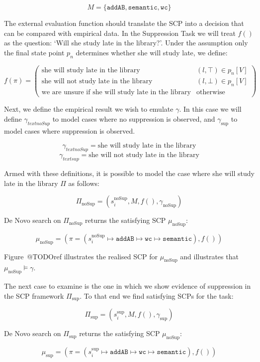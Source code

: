 \[
M=\{\texttt{addAB}, \texttt{semantic}, \texttt{wc}\}
\]

The external evaluation function should translate the SCP into a decision that can be compared with empirical data. In the Suppression Task we will treat $f()$ as the question: `Will she study late in the library?'. Under the assumption only the final state point $p_n$
determines whether she will study late, we define:

\[
f(\pi) = \begin{pmatrix} \text{she will study late in the library} & (l,\top) \in p_n[V] \\   \text{she will not study late in the library} & (l,\bot) \in p_n[V] \\ 
\text{we are unsure if she will study late in the library} & \text{otherwise} \end{pmatrix}
\]

Next, we define the empirical result we wish to emulate $\gamma$. In this case we will define $\gamma_{text{noSup}}$ to model cases where no suppression is observed, and $\gamma_{\text{sup}}$ to model cases where suppression is observed.

\[\gamma_{text{noSup}} = \text{she will study late in the library} \]
\[\gamma_{text{sup}} = \text{she will not study late in the library} \]

Armed with these definitions, it is possible to model the case where she will study late in the library $\Pi$ as follows:

\[\Pi_\text{noSup}=(s_i^{\text{noSup}},M,f(),\gamma_{\text{noSup}})\]

De Novo search on $\Pi_\text{noSup}$ returns the satisfying SCP $\mu_\text{noSup}$:

\[\mu_\text{noSup}=(\pi=(s_i^{\text{noSup}} \longmapsto \texttt{addAB} \longmapsto \texttt{wc} \longmapsto \texttt{semantic}),f())\]

Figure~@TODOref illustrates the realised SCP for $\mu_\text{noSup}$ and illustrates that $\mu_\text{noSup} \models \gamma$.

The next case to examine is the one in which we show evidence of suppression in the SCP framework $\Pi_\text{sup}$. To that end we find satisfying SCPs for the task:

\[\Pi_\text{sup}=(s_i^{\text{sup}},M,f(),\gamma_{\text{sup}})\]

De Novo search on $\Pi_\text{sup}$ returns the satisfying SCP $\mu_\text{noSup}$:

\[\mu_\text{sup}=(\pi=(s_i^{\text{sup}} \longmapsto \texttt{addAB} \longmapsto \texttt{wc} \longmapsto \texttt{semantic}),f())\]

